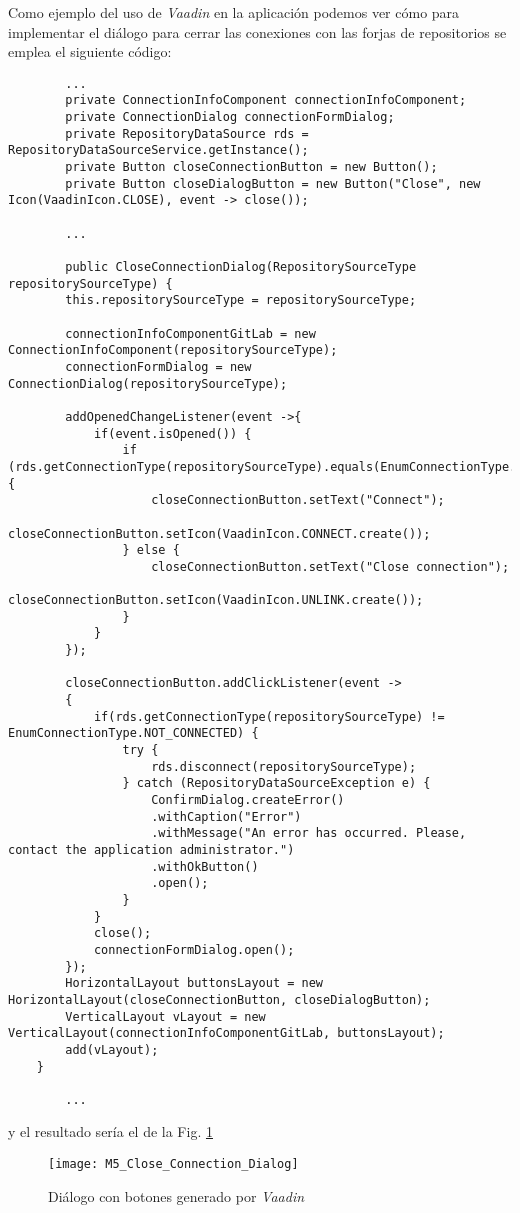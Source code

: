 Como ejemplo del uso de \textit{Vaadin} en la aplicación podemos ver cómo para implementar el diálogo para cerrar las conexiones con las forjas de repositorios se emplea el siguiente código:

{\tiny
\begin{verbatim}
		...
		private ConnectionInfoComponent connectionInfoComponent;
		private ConnectionDialog connectionFormDialog;
		private RepositoryDataSource rds = RepositoryDataSourceService.getInstance();
		private Button closeConnectionButton = new Button();
		private Button closeDialogButton = new Button("Close", new Icon(VaadinIcon.CLOSE), event -> close());
		
		...
		
		public CloseConnectionDialog(RepositorySourceType repositorySourceType) {
		this.repositorySourceType = repositorySourceType;
		
		connectionInfoComponentGitLab = new ConnectionInfoComponent(repositorySourceType);
		connectionFormDialog = new ConnectionDialog(repositorySourceType);
		
		addOpenedChangeListener(event ->{
			if(event.isOpened()) {
				if (rds.getConnectionType(repositorySourceType).equals(EnumConnectionType.NOT_CONNECTED)) {
					closeConnectionButton.setText("Connect");
					closeConnectionButton.setIcon(VaadinIcon.CONNECT.create());
				} else {
					closeConnectionButton.setText("Close connection");
					closeConnectionButton.setIcon(VaadinIcon.UNLINK.create());
				}							
			}
		});
		
		closeConnectionButton.addClickListener(event ->  
		{
			if(rds.getConnectionType(repositorySourceType) != EnumConnectionType.NOT_CONNECTED) {
				try {
					rds.disconnect(repositorySourceType);
				} catch (RepositoryDataSourceException e) {
					ConfirmDialog.createError()
					.withCaption("Error")
					.withMessage("An error has occurred. Please, contact the application administrator.")
					.withOkButton()
					.open();
				}
			}
			close();
			connectionFormDialog.open();
		});
		HorizontalLayout buttonsLayout = new HorizontalLayout(closeConnectionButton, closeDialogButton);
		VerticalLayout vLayout = new VerticalLayout(connectionInfoComponentGitLab, buttonsLayout);
		add(vLayout);
	}

		...
\end{verbatim}
}

y el resultado sería el de la Fig. \ref{fig:M5_Close_Connection_Dialog}
\begin{figure}[!h]
	\centering
	\texttt{[image: M5\_Close\_Connection\_Dialog]}
	\caption{Diálogo con botones generado por \textit{Vaadin}}\label{fig:M5_Close_Connection_Dialog}
\end{figure}
\FloatBarrier

